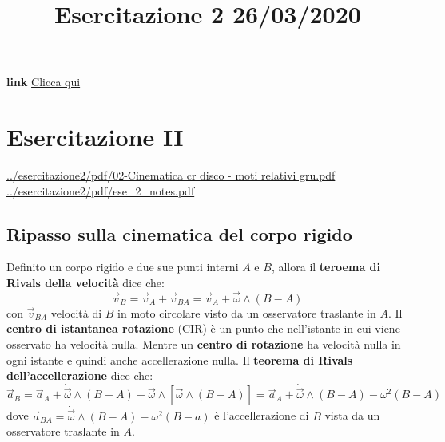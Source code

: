 \title{Esercitazione 2 26/03/2020}\newline
\textbf{link} \href{https://web.microsoftstream.com/video/c4d111d7-4825-4513-afe0-f0fd323398dd}{Clicca qui}
\section{Esercitazione II}
\url{../esercitazione2/pdf/02-Cinematica cr disco - moti relativi gru.pdf}\newline
\url{../esercitazione2/pdf/ese_2_notes.pdf}\newline
\subsection{Ripasso sulla cinematica del corpo rigido}
Definito un corpo rigido e due sue punti interni $A$ e $B$, allora il \textbf{teroema di Rivals della velocità} dice che:
\[
    \vec{v}_B = \vec{v}_A + \vec{v}_{BA} = \vec{v}_A + \vec{\omega} \land (B-A)
\]
con $\vec{v}_{BA}$ velocità di $B$ in moto circolare visto da un osservatore traslante in $A$.\newline
\newline
Il \textbf{centro di istantanea rotazione} (CIR) è un punto che nell'istante in cui viene osservato ha velocità nulla. Mentre un \textbf{centro di rotazione} ha velocità nulla in ogni istante e quindi anche accellerazione nulla.\newline
\newline
Il \textbf{teorema di Rivals dell'accellerazione} dice che:
\[
    \vec{a}_B = \vec{a}_A + \dot{\vec{\omega}} \land (B-A) + \vec{\omega} \land [\vec{\omega} \land (B-A)] = \vec{a}_A + \dot{\vec{\omega}} \land (B-A) - \omega^2 (B-A)
\]
dove $\vec{a}_{BA} = \dot{\vec{\omega}} \land (B-A) - \omega^2 (B-a)$ è l'accellerazione di $B$ vista da un osservatore traslante in $A$.
